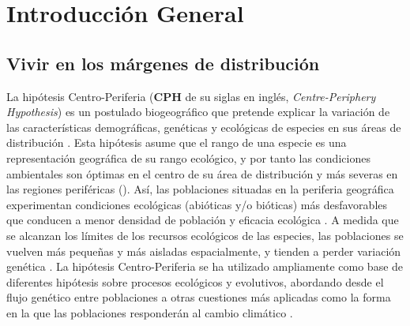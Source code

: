 %

\chapter{\textcolor{ctcolormain}{Introducción General}}\label{sec:intro}
\newpage

\section{Vivir en los márgenes de distribución}\label{sec:intro:rear-edge}

La hipótesis Centro-Periferia (\textbf{CPH} de su siglas en inglés, \textit{Centre-Periphery Hypothesis}) es un postulado biogeográfico que pretende explicar la variación de las características demográficas, genéticas y ecológicas de especies en sus áreas de distribución \autocite{Sextonetal2009EvolutionEcology, Pirononetal2015GeographicClimatic}. Esta hipótesis asume que el rango de una especie es una representación geográfica de su rango ecológico, y por tanto las condiciones ambientales son óptimas en el centro de su área de distribución y más severas en las regiones periféricas \autocite{Pirononetal2017GeographicVariation}(). Así, las poblaciones situadas en la periferia geográfica experimentan condiciones ecológicas (abióticas y/o bióticas) más desfavorables que conducen a menor densidad de población y eficacia ecológica \autocite[\textit{fitness},][]{Brown1984RelationshipAbundance}. A medida que se alcanzan los límites de los recursos ecológicos de las especies, las poblaciones se vuelven más pequeñas y más aisladas espacialmente, y tienden a perder variación genética \autocites[][]{Karketal2008HowDoes,Garciaetal2010LivingEdge}. La hipótesis Centro-Periferia se ha utilizado ampliamente como base de diferentes hipótesis sobre procesos ecológicos y evolutivos, abordando desde el flujo genético entre poblaciones a otras cuestiones más aplicadas como la forma en la que las poblaciones responderán al cambio climático \autocites{SagarinGaines2002AbundantCentre}. 

